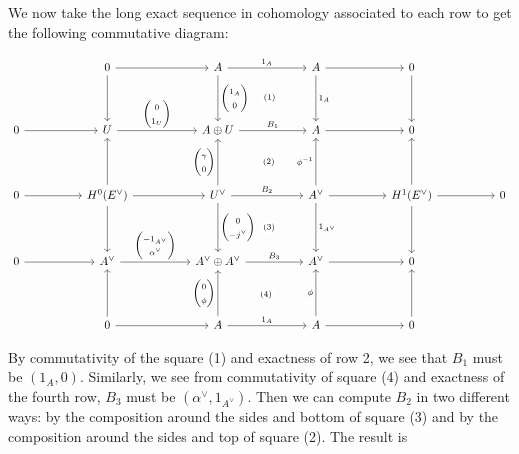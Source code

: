\documentclass{amsart}
\theoremstyle{definition}
\begin{document}
We now take the long exact sequence in cohomology associated to each
row to get the following commutative diagram:

\begin{equation*}
\begin{tikzcd}[column sep=5em,row sep=4em]
& 0
\arrow[r]
\arrow[d]
& A
\arrow[r,"1_{A}"]
\arrow[d,"\begin{pmatrix}1_{A}\\ 0   \end{pmatrix}"]
& A
\arrow[r]
\arrow[d,"1_{A}"]
& 0
\arrow[d]
& 
\\
0
\arrow[r]
& U
\arrow[r,"\begin{pmatrix}0\\ 1_{U}   \end{pmatrix} "]
& A\oplus U
\arrow[r,"B_{1}"]
\arrow[ur, phantom, "{\scriptstyle(1)}" description]
& A
\arrow[r]
& 0
& 
\\
0\arrow[r]
& H^{0}(E^{\vee})
\arrow[r]
\arrow[u]
\arrow[d]
& U^{\vee }
\arrow[ur, phantom, "{\scriptstyle(2)}" description]
\arrow[r,"B_{2}"]
\arrow[u,"\begin{pmatrix}\gamma \\ 0   \end{pmatrix}"]
\arrow[d,"\begin{pmatrix}0 \\ -j^{\vee }   \end{pmatrix}"]
& A^{\vee}
\arrow[r]
\arrow[u,"\phi^{-1}"]
\arrow[d,"1_{A^{\vee}}"]
& H^{1}(E^{\vee})
\arrow[r]
\arrow[u]
\arrow[d]
& 0
\\
0
\arrow[r]
& A^{\vee }
\arrow[r," \begin{pmatrix} -1_{A^{\vee}}\\ \alpha^{\vee }  \end{pmatrix}"]
& A^{\vee }\oplus A^{\vee }
\arrow[ur, phantom, "{\scriptstyle(3)}" description]
\arrow[r,"B_{3}"]
& A^{\vee }
\arrow[r]
& 0
&
\\
& 0
\arrow[r]
\arrow[u]
& A
\arrow[ur, phantom, "{\scriptstyle(4)}" description]
\arrow[r,"1_{A}"]
\arrow[u," \begin{pmatrix} 0\\ \phi   \end{pmatrix}"]
& A
\arrow[r]
\arrow[u,"\phi "]
& 0
\arrow[u]
&
\end{tikzcd}
\end{equation*}

By commutativity of the square (1) and exactness of row 2, we see that
$B_{1}$ must be $(1_{A},0)$. Similarly, we see from commutativity of
square (4) and exactness of the fourth row, $B_{3}$ must be
$(\alpha^{\vee},1_{A^{\vee}})$. Then we can compute $B_{2}$ in two
different ways: by the composition around the sides and bottom of
square (3) and by the composition around the sides and top of square
(2). The result is
\end{document}
